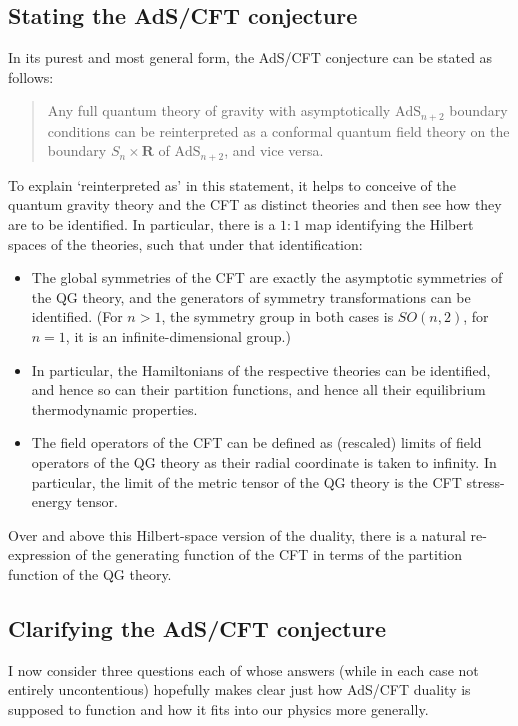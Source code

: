 \documentclass[12pt]{article}
\newcommand{\re}{\ensuremath{\mathbf{R}}}
\newcommand{\AdS}{\mathrm{AdS}}
\begin{document}
\subsection{Stating the AdS/CFT conjecture}\label{ads-intro}

In its purest and most general form, the AdS/CFT conjecture can be stated as follows:
\begin{quote}
Any full quantum theory of gravity with asymptotically $\AdS_{n+2}$ boundary conditions can be reinterpreted as a conformal quantum field theory on the boundary $S_n\times \re$ of $\AdS_{n+2}$, and vice versa.
\end{quote}
To explain `reinterpreted as' in this statement, it helps to conceive of the quantum gravity theory and the CFT as distinct theories and then see how they are to be identified. In particular, there is a $1:1$ map identifying the Hilbert spaces of the theories, such that under that identification:
\begin{itemize}
\item The global symmetries of the CFT are exactly the asymptotic symmetries of the QG theory, and the generators of symmetry transformations can be identified. (For $n>1$, the symmetry group in both cases is $SO(n,2)$, for $n=1$, it is an infinite-dimensional group.)
\item In particular, the Hamiltonians of the respective theories can be identified, and hence so can their partition functions, and hence all their equilibrium thermodynamic properties.
\item The field operators of the CFT can be defined as (rescaled) limits of field operators of the QG theory as their radial coordinate is taken to infinity. In particular, the limit of the metric tensor of the QG theory is the CFT stress-energy tensor.
\end{itemize}
Over and above this Hilbert-space version of the duality, there is a natural re-expression of the generating function of the CFT  in terms of the partition function of the QG theory.

\subsection{Clarifying the AdS/CFT conjecture}

I now consider three questions each of whose answers (while in each case not entirely uncontentious) hopefully makes clear just how AdS/CFT duality is supposed to function and how it fits into our physics more generally.
\end{document}
